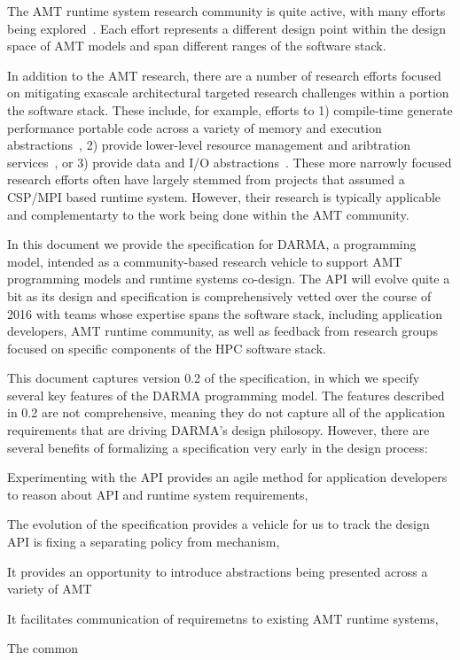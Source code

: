 The \gls{AMT} \gls{runtime system} research community is quite active, with many efforts being
explored~\cite{OCR,STAPL,Legion,StencilHPX,Charm++,Uintah, Loci}.
Each effort represents a different design point within the design space of AMT
models and span different ranges of the software stack.  

In addition to the \gls{AMT} research, there are a number of 
research efforts focused on mitigating exascale architectural targeted research challenges 
within a portion the software stack.  These include, for example, efforts to 1) compile-time
generate performance portable code across a variety of memory and execution
abstractions~\cite{Kokkos, RAJA}, 2) provide lower-level resource management
and aribtration services~\cite{Qthreads, Hobbs, Kitten}, or 3) provide data and
I/O abstractions~\cite{Kelpie, Nessie, Adios, DataSpaces, LLNLandLANLDW}.  These more narrowly focused research efforts often have largely stemmed from projects that
assumed a \gls{CSP}/\gls{MPI} based runtime system.  However, their research is
typically applicable and complementarty to the work being done within the
\gls{AMT} community. 

  
In this document we provide the specification for DARMA,
a programming model, intended as a community-based research vehicle to support AMT programming models and runtime
systems co-design. 
The \gls{API} will evolve quite a bit as its design and specification is comprehensively vetted over
the course of 2016 with teams whose expertise spans the software stack,
including application
developers, \gls{AMT} runtime community, as well as feedback from
research groups focused on specific components of the \gls{HPC} software stack.

This document captures version 0.2 of the specification, in which we 
specify several key features of the DARMA programming model. The features
described in 0.2 are not comprehensive, meaning they do not capture all of the
application requirements that are driving DARMA's design philosopy. 
However, there are several benefits of formalizing a specification very early in the
design process:
\begin{compactenum}
\item Experimenting with the \gls{API} provides an agile method for application
developers to reason about \gls{API} and runtime system requirements,
\item The evolution of the specification provides a vehicle for us to track the
design 
\gls{API} is fixing a separating
policy from mechanism, 
\item It provides an opportunity to introduce abstractions 
being presented across a variety of AMT
\item It facilitates communication of requiremetns to existing AMT runtime
systems,
\end{compactenum}
The common 



